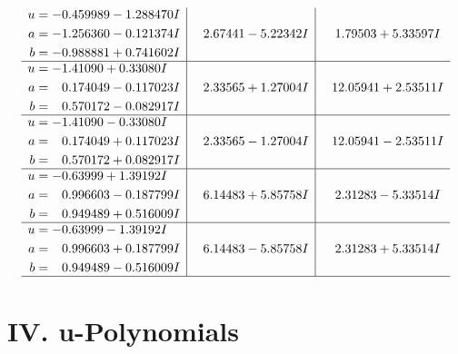 \documentclass[1p]{elsarticle_modified}
\theoremstyle{definition}
\begin{document}
$$\begin{array}{c|c|c}
\begin{aligned}
u &= -0.459989 - 1.288470 I \\
a &= -1.256360 - 0.121374 I \\
b &= -0.988881 + 0.741602 I\end{aligned}
 & \phantom{-}2.67441 - 5.22342 I & \phantom{-}1.79503 + 5.33597 I \\ \hline\begin{aligned}
u &= -1.41090 + 0.33080 I \\
a &= \phantom{-}0.174049 - 0.117023 I \\
b &= \phantom{-}0.570172 - 0.082917 I\end{aligned}
 & \phantom{-}2.33565 + 1.27004 I & \phantom{-}12.05941 + 2.53511 I \\ \hline\begin{aligned}
u &= -1.41090 - 0.33080 I \\
a &= \phantom{-}0.174049 + 0.117023 I \\
b &= \phantom{-}0.570172 + 0.082917 I\end{aligned}
 & \phantom{-}2.33565 - 1.27004 I & \phantom{-}12.05941 - 2.53511 I \\ \hline\begin{aligned}
u &= -0.63999 + 1.39192 I \\
a &= \phantom{-}0.996603 - 0.187799 I \\
b &= \phantom{-}0.949489 + 0.516009 I\end{aligned}
 & \phantom{-}6.14483 + 5.85758 I & \phantom{-}2.31283 - 5.33514 I \\ \hline\begin{aligned}
u &= -0.63999 - 1.39192 I \\
a &= \phantom{-}0.996603 + 0.187799 I \\
b &= \phantom{-}0.949489 - 0.516009 I\end{aligned}
 & \phantom{-}6.14483 - 5.85758 I & \phantom{-}2.31283 + 5.33514 I\\
 \hline 
 \end{array}$$\newpage
\newpage\renewcommand{\arraystretch}{1}
\centering \section*{ IV. u-Polynomials}
\end{document}
